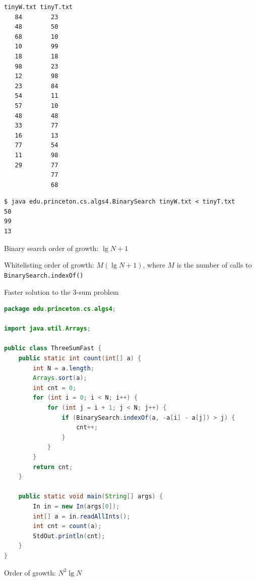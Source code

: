 \documentclass[8pt,a4paper,compress]{beamer}
\begin{document}
\begin{frame}[fragile]
\pause

\begin{lstlisting}[language={}]
tinyW.txt tinyT.txt
   84        23
   48        50
   68        10
   10        99
   18        18
   98        23
   12        98
   23        84
   54        11
   57        10
   48        48
   33        77
   16        13
   77        54
   11        98
   29        77
             77
             68
\end{lstlisting}

\pause

\begin{lstlisting}[language={}]
$ java edu.princeton.cs.algs4.BinarySearch tinyW.txt < tinyT.txt
50
99
13
\end{lstlisting}

\pause
\bigskip

Binary search order of growth: $\lg N + 1$ 

\pause
\bigskip

Whitelisting order of growth: $M(\lg N + 1)$, where $M$ is the number of calls to \lstinline{BinarySearch.indexOf()}
\end{frame}

\begin{frame}[fragile]
\pause

Faster solution to the 3-sum problem
\begin{lstlisting}[language=Java]
package edu.princeton.cs.algs4;

import java.util.Arrays;

public class ThreeSumFast {
    public static int count(int[] a) {
        int N = a.length;
        Arrays.sort(a);
        int cnt = 0;
        for (int i = 0; i < N; i++) {
            for (int j = i + 1; j < N; j++) {
                if (BinarySearch.indexOf(a, -a[i] - a[j]) > j) {
                    cnt++;
                }
            }
        }
        return cnt;
    }
    
    public static void main(String[] args) {
        In in = new In(args[0]);
        int[] a = in.readAllInts();
        int cnt = count(a);
        StdOut.println(cnt);
    }
}
\end{lstlisting}

\pause

Order of growth: $N^2\lg N$
\end{frame}
\end{document}
